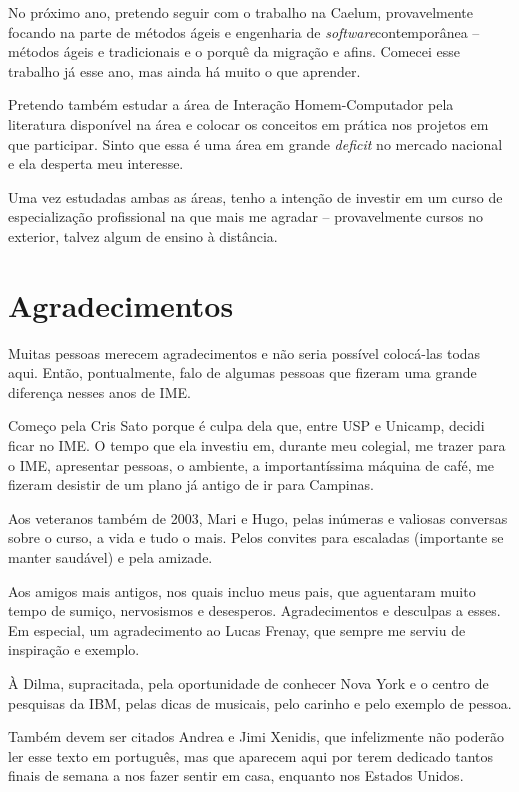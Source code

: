 \documentclass[titlepage,a4paper]{article}
\newcommand{\software}{\textit{software}}
\begin{document}
No próximo ano, pretendo seguir com o trabalho na Caelum, provavelmente focando na parte de métodos ágeis e engenharia de \software contemporânea -- métodos ágeis e tradicionais e o porquê da migração e afins. Comecei esse trabalho já esse ano, mas ainda há muito o que aprender.

Pretendo também estudar a área de Interação Homem-Computador pela literatura disponível na área e colocar os conceitos em prática nos projetos em que participar. Sinto que essa é uma área em grande \textit{deficit} no mercado nacional e ela desperta meu interesse.

Uma vez estudadas ambas as áreas, tenho a intenção de investir em um curso de especialização profissional na que mais me agradar -- provavelmente cursos no exterior, talvez algum de ensino à distância.

\section{Agradecimentos}

Muitas pessoas merecem agradecimentos e não seria possível colocá-las todas aqui. Então, pontualmente, falo de algumas pessoas que fizeram uma grande diferença nesses anos de IME. 

Começo pela Cris Sato porque é culpa dela que, entre USP e Unicamp, decidi ficar no IME. O tempo que ela investiu em, durante meu colegial, me trazer para o IME, apresentar pessoas, o ambiente, a importantíssima máquina de café, me fizeram desistir de um plano já antigo de ir para Campinas.

Aos veteranos também de 2003, Mari e Hugo, pelas inúmeras e valiosas conversas sobre o curso, a vida e tudo o mais. Pelos convites para escaladas (importante se manter saudável) e pela amizade.

Aos amigos mais antigos, nos quais incluo meus pais, que aguentaram muito tempo de sumiço, nervosismos e desesperos. Agradecimentos e desculpas a esses. Em especial, um agradecimento ao Lucas Frenay, que sempre me serviu de inspiração e exemplo.

À Dilma, supracitada, pela oportunidade de conhecer Nova York e o centro de pesquisas da IBM, pelas dicas de musicais, pelo carinho e pelo exemplo de pessoa.

Também devem ser citados Andrea e Jimi Xenidis, que infelizmente não poderão ler esse texto em português, mas que aparecem aqui por terem dedicado tantos finais de semana a nos fazer sentir em casa, enquanto nos Estados Unidos.
\end{document}
